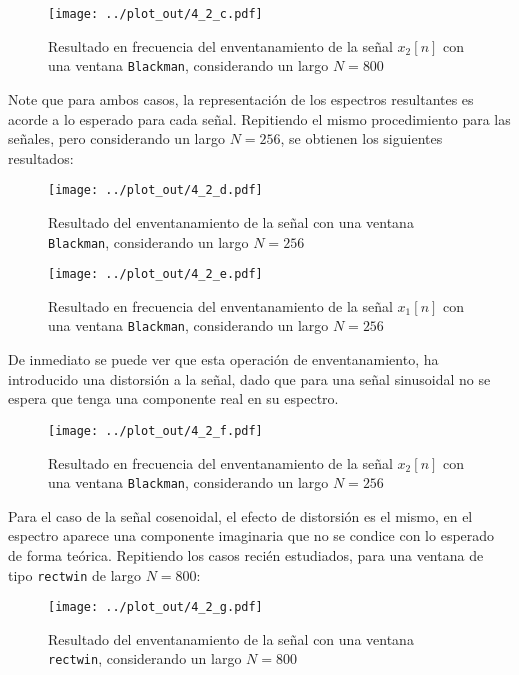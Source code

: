 	\begin{figure}[H]
			\center
			\texttt{[image: ../plot\_out/4\_2\_c.pdf]}
			\caption{Resultado en frecuencia del enventanamiento de la señal $x_{2}[n]$ con una ventana \texttt{Blackman}, considerando un largo $N = 800$}
			\label{fig:4_blackman_800_2}
		\end{figure}
		
		Note que para ambos casos, la representación de los espectros resultantes es acorde a lo esperado para cada señal. Repitiendo el mismo procedimiento para las señales, pero considerando un largo $N = 256$, se obtienen los siguientes resultados:
	\begin{figure}[H]
			\center
			\texttt{[image: ../plot\_out/4\_2\_d.pdf]}
			\caption{Resultado del enventanamiento de la señal con una ventana \texttt{Blackman}, considerando un largo $N = 256$}
			\label{fig:4_sample_blackman_256}
		\end{figure}	
	
	\begin{figure}[H]
			\center
			\texttt{[image: ../plot\_out/4\_2\_e.pdf]}
			\caption{Resultado en frecuencia del enventanamiento de la señal $x_{1}[n]$ con una ventana \texttt{Blackman}, considerando un largo $N = 256$}
			\label{fig:4_blackman_256_1}
		\end{figure}	
			
			De inmediato se puede ver que esta operación de enventanamiento, ha introducido una distorsión a la señal, dado que para una señal sinusoidal no se espera que tenga una componente real en su espectro. 

	\begin{figure}[H]
			\center
			\texttt{[image: ../plot\_out/4\_2\_f.pdf]}
			\caption{Resultado en frecuencia del enventanamiento de la señal $x_{2}[n]$ con una ventana \texttt{Blackman}, considerando un largo $N = 256$}
			\label{fig:4_blackman_256_2}
		\end{figure}	
			
			Para el caso de la señal cosenoidal, el efecto de distorsión es el mismo, en el espectro aparece una componente imaginaria que no se condice con lo esperado de forma teórica. Repitiendo los casos recién estudiados, para una ventana de tipo \texttt{rectwin} de largo $N = 800$:
						
	\begin{figure}[H]
			\center
			\texttt{[image: ../plot\_out/4\_2\_g.pdf]}
			\caption{Resultado del enventanamiento de la señal con una ventana \texttt{rectwin}, considerando un largo $N = 800$}
			\label{fig:4_sample_rectwin_800}
		\end{figure}	
	
